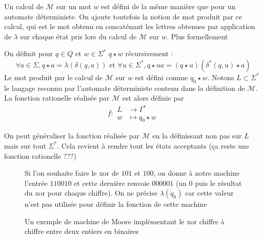 \documentclass{scrartcl}
\begin{document}
\begin{flushleft}
Un calcul de $\mathcal{M}$ sur un mot $w$ est défini de la même manière que pour un automate déterministe. On ajoute
toutefois la notion de mot produit par ce calcul, qui est le mot obtenu en concaténant les lettres obtenues
par application de $\lambda$ sur chaque état pris lors du calcul de $\mathcal{M}$ sur $w$. Plus formellement

\begin{define}
    On définit pour $q \in Q$ et $w \in \Sigma^*$ $q \star w$ récursivement :
    \[ \forall a \in \Sigma, q \star a = \lambda(\delta(q, a)) \text{ et } \forall u \in \Sigma^*,
    q \star ua = (q \star u)(\delta^*(q, u) \star a) \]
    Le mot produit par le calcul de $\mathcal{M}$ sur $w$ est défini comme $q_0 \star w$. Notons $L \subset \Sigma^*$
    le langage reconnu par l'automate déterministe contenu dans la définition de $\mathcal{M}$. La fonction rationelle
    réalisée par $\mathcal{M}$ est alors définie par
    \[ f : \begin{array}{cl}
        L &\longrightarrow \Gamma^*\\
        w &\longmapsto q_0 \star w
    \end{array} \]
\end{define}

On peut généraliser la fonction réalisée par $\mathcal{M}$ en la définissant non pas sur $L$ mais sur tout
$\Sigma^*$. Cela revient à rendre tout les états acceptants (ça reste une fonction rationelle ???)

\begin{figure}[h]
    \caption{Un exemple de machine de Moore implémentant le xor chiffre à chiffre entre deux entiers en binaires}
    \begin{center}
        Si l'on souhaite faire le xor de $101$ et $100$, on donne à notre machine l'entrée
        $110010$ et cette dernière renvoie $000001$ (un 0 puis le résultat du xor pour chaque chiffre).
        On ne précise $\lambda(q_0)$ car cette valeur n'est pas utilisée pour définir la fonction de cette machine\\
        \vspace*{0.5cm}
\end{center}
\end{figure}
\end{flushleft}
\end{document}
